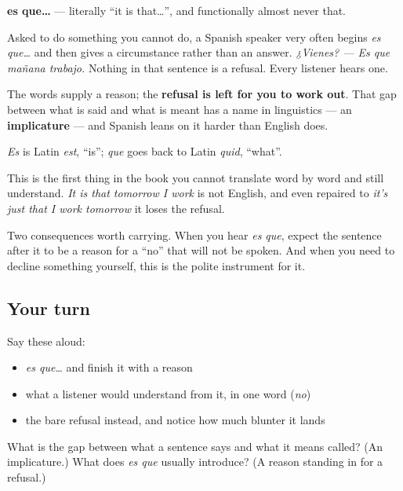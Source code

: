 \begin{cousinweb}
\textbf{es que…} — literally \textquotedblleft{}it is that…\textquotedblright{}, and functionally almost never that.

Asked to do something you cannot do, a Spanish speaker very often begins \emph{es que…} and then gives a circumstance rather than an answer. \emph{¿Vienes? — Es que mañana trabajo.} Nothing in that sentence is a refusal. Every listener hears one.

The words supply a reason; the \textbf{refusal is left for you to work out}. That gap between what is said and what is meant has a name in linguistics — an \textbf{implicature} — and Spanish leans on it harder than English does.

\emph{Es} is Latin \emph{est}, \textquotedblleft{}is\textquotedblright{}; \emph{que} goes back to Latin \emph{quid}, \textquotedblleft{}what\textquotedblright{}.
\end{cousinweb}

\begin{grammarlens}[title={What you've built}]
This is the first thing in the book you cannot translate word by word and still understand. \emph{It is that tomorrow I work} is not English, and even repaired to \emph{it's just that I work tomorrow} it loses the refusal.

Two consequences worth carrying. When you hear \emph{es que}, expect the sentence after it to be a reason for a \textquotedblleft{}no\textquotedblright{} that will not be spoken. And when you need to decline something yourself, this is the polite instrument for it.
\end{grammarlens}

\subsection*{Your turn}
Say these aloud:

\begin{itemize}
\raggedright
  \item \emph{es que…} and finish it with a reason
  \item what a listener would understand from it, in one word (\emph{no})
  \item the bare refusal instead, and notice how much blunter it lands
\end{itemize}

\begin{tcolorbox}[breakable,colback=teal!4,colframe=teal!35!black,title={Before you move on}]
What is the gap between what a sentence says and what it means called? (An implicature.) What does \emph{es que} usually introduce? (A reason standing in for a refusal.)
\end{tcolorbox}
